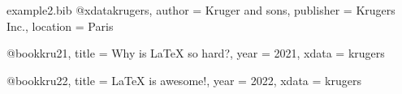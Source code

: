 \begin{example}[standalone,
  biber,
  paperwidth=6cm,
  paperheight=7cm,
]
\begin{filecontents}{example2.bib} 
@xdata{krugers,
  author    = {Kruger {and} sons},
  publisher = {Krugers Inc.},
  location  = {Paris}
}

@book{kru21,
  title = {Why is \LaTeX{} so hard?},
  year  = {2021},
  xdata = {krugers}
}

@book{kru22,
  title = {\LaTeX{} is awesome!},
  year  = {2022},
  xdata = {krugers}
}
\end{filecontents} %
\usepackage{biblatex}

\sloppy

\nocite{*}
\noindent
\printbibliography

\end{example}
